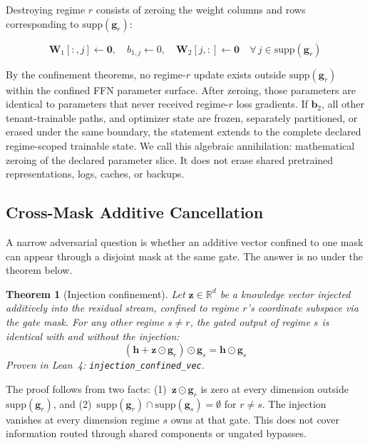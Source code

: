 \documentclass[11pt,a4paper]{article}
\newtheorem{theorem}{Theorem}
\newcommand{\R}{\mathbb{R}}
\newcommand{\bh}{\mathbf{h}}
\newcommand{\bW}{\mathbf{W}}
\newcommand{\bg}{\mathbf{g}}
\begin{document}
Destroying regime $r$ consists of zeroing the weight columns and
rows corresponding to $\mathrm{supp}(\bg_r)$:

\begin{equation}
    \bW_1[:,j] \leftarrow \mathbf{0}, \quad
    b_{1,j} \leftarrow 0, \quad
    \bW_2[j,:] \leftarrow \mathbf{0} \quad
    \forall\, j \in \mathrm{supp}(\bg_r)
\end{equation}

By the confinement theorems, no regime-$r$ update exists outside
$\mathrm{supp}(\bg_r)$ within the confined FFN parameter surface.
After zeroing, those parameters are identical to parameters that
never received regime-$r$ loss gradients.  If $\mathbf{b}_2$, all
other tenant-trainable paths, and optimizer state are frozen,
separately partitioned, or erased under the same boundary, the statement
extends to the complete declared regime-scoped trainable state.  We
call this algebraic annihilation: mathematical zeroing of the
declared parameter slice.  It does not erase shared pretrained
representations, logs, caches, or backups.

\subsection{Cross-Mask Additive Cancellation}
\label{sec:additive-cancellation}

A narrow adversarial question is whether an additive vector confined
to one mask can appear through a disjoint mask at the same gate.  The
answer is no under the theorem below.

\begin{theorem}[Injection confinement]
\label{thm:injection-confinement}
Let $\mathbf{z} \in \R^d$ be a knowledge vector injected
additively into the residual stream, confined to regime $r$'s
coordinate subspace via the gate mask.  For any other regime
$s \neq r$, the gated output of regime $s$ is identical with
and without the injection:
\[
    (\bh + \mathbf{z} \odot \bg_r) \odot \bg_s = \bh \odot \bg_s
\]
Proven in Lean~4: \texttt{injection\_confined\_vec}.
\end{theorem}

The proof follows from two facts: (1)~$\mathbf{z} \odot \bg_r$
is zero at every dimension outside $\mathrm{supp}(\bg_r)$, and
(2)~$\mathrm{supp}(\bg_r) \cap \mathrm{supp}(\bg_s) = \emptyset$
for $r \neq s$.  The injection vanishes at every dimension regime
$s$ owns at that gate.  This does not cover information routed
through shared components or ungated bypasses.
\end{document}
